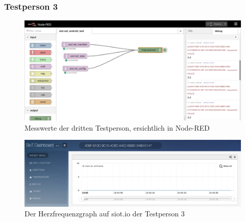 \subsubsection{Testperson 3}
\begin{figure}[H]
  \centering
  \includegraphics[scale=0.375]{98_Bilder/11_Ergebnis/heartrateADnodeRED}
  \caption[Node-RED Messwerte Person 3]{Messwerte der dritten Testperson, ersichtlich in Node-RED}
\end{figure}
\begin{figure}[H]
  \centering
  \includegraphics[scale=0.375]{98_Bilder/11_Ergebnis/heartrateADsiotio}
  \caption[siot.io Dashboard Graph Person 3]{Der Herzfrequenzgraph auf siot.io der Testperson 3}
\end{figure}
